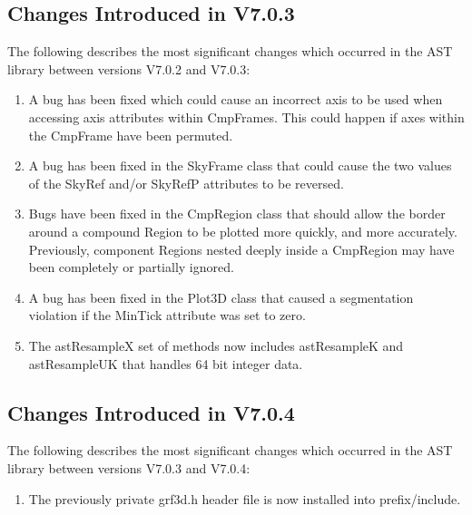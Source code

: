 \documentclass[twoside,11pt]{starlink}
\begin{document}
\subsection{Changes Introduced in V7.0.3}

The following describes the most significant changes which
occurred in the AST library between versions V7.0.2 and V7.0.3:

\begin{enumerate}

\item A bug has been fixed which could cause an incorrect axis to be used when
accessing axis attributes within CmpFrames. This could happen if axes
within the CmpFrame have been permuted.

\item A bug has been fixed in the SkyFrame class that could cause the two
values of the SkyRef and/or SkyRefP attributes to be reversed.

\item Bugs have been fixed in the CmpRegion class that should allow the border
around a compound Region to be plotted more quickly, and more accurately.
Previously, component Regions nested deeply inside a CmpRegion may have
been completely or partially ignored.

\item A bug has been fixed in the Plot3D class that caused a segmentation
violation if the MinTick attribute was set to zero.

\item The astResampleX set of methods now includes astResampleK and
astResampleUK that handles 64 bit integer data.

\end{enumerate}


\subsection{Changes Introduced in V7.0.4}

The following describes the most significant changes which
occurred in the AST library between versions V7.0.3 and V7.0.4:


\begin{enumerate}

\item The previously private grf3d.h header file is now installed into
prefix/include.

\end{enumerate}
\end{document}
